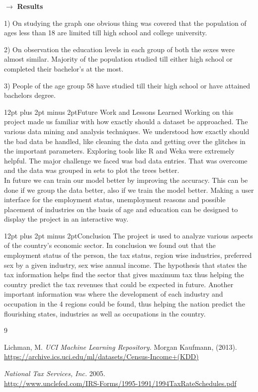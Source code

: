 \documentclass[9pt, twocolumn]{article}
\makeatletter
\def\section{\@startsection {section}{1}{\z@}{24pt plus 2pt minus 2pt}
{12pt plus 2pt minus 2pt}{\large\bf}}
\makeatother
\begin{document}
\par \noindent $\rightarrow$ \textbf{Results}

\par 1) On studying the graph one obvious thing was covered that the population of ages less than 18 are limited till high school and college university. 
\par 2) On observation the education levels in each group of both the sexes were almost similar.  Majority of the population studied till either high school or completed their bachelor's at the most.
\par 3) People of the age group 58 have studied till their high school or have attained bachelors degree.


\section{Future Work and Lessons Learned}
Working on this project made us familiar with how exactly should a dataset be approached. The various data mining and analysis techniques. We understood how exactly should the bad data be handled, like cleaning the data and getting over the glitches in the important parameters. Exploring tools like R and Weka were extremely helpful. The major challenge we faced was bad data entries. That was overcome and the data was grouped in sets to plot the trees better. \\

In future we can train our model better by improving the accuracy. This can be done if we group the data better, also if we train the model better. Making a user interface for the employment status, unemployment reasons and possible placement of industries on the basis of age and education can be designed to display the project in an interactive way.  

\section{Conclusion}
The project is used to analyze various aspects of the country's economic sector. In conclusion we found out that the employment status of the person, the tax status, region wise industries, preferred sex by a given industry, sex wise annual income. The hypothesis that states the tax information helps find the sector that gives maximum tax thus helping the country predict the tax revenues that could be expected in future. Another important information was where the development of each industry and occupation in the 4 regions could be found, thus helping the nation predict the flourishing states, industries as well as occupations in the country.

\begin{thebibliography}{9}

Lichman, M.  
{\em UCI Machine Learning Repository.} Morgan Kaufmann, (2013).\\
\url{https://archive.ics.uci.edu/ml/datasets/Census-Income+(KDD)}

{\em National Tax Services, Inc.} 2005.\\
\url{http://www.unclefed.com/IRS-Forms/1995-1991/1994TaxRateSchedules.pdf}


\end{thebibliography}
\end{document}
